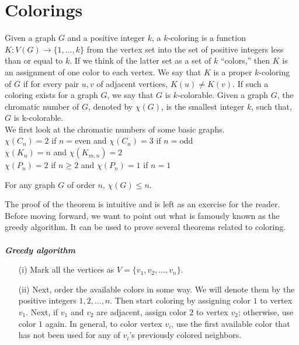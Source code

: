 \documentclass[../basic_graph_theory.tex]{subfiles}
\begin{document}
\chapter{Colorings}
\setcounter{chapter}{7} %
\setcounter{section}{7}
\setcounter{equation}{7}
\setcounter{figure}{7}

Given a graph $G$ and a positive integer $k$, a $k$-coloring is a function $K : V (G) \to \{1,...,k\}$ from the vertex set into the set of positive integers less than or equal to $k$. If we think of the latter set as a set of $k$ “colors,” then $K$ is an assignment of one color to each vertex. We say that $K$ is a proper $k$-coloring of $G$ if for every pair $u,v$ of adjacent vertices, $K(u) \neq K(v)$. If such a coloring exists for a graph $G$, we say that $G$ is $k$-colorable. Given a graph $G$, the chromatic number of $G$, denoted by $\chi(G)$, is the smallest integer $k$, such that, $G$ is k-colorable.\\
We first look at the chromatic numbers of some basic graphs.\\
$\chi(C_n)=2$ if $n=$even and $\chi(C_n)=3$ if $n=$odd\\
$\chi(K_n)=n$ and $\chi(K_{m,n})=2$\\
$\chi(P_n)=2$ if $n \ge 2$ and $\chi(P_n)=1$ if $n=1$\\

\begin{thm}
    For any graph $G$ of order $n$, $\chi(G) \le n$. 
\end{thm}
The proof of the theorem is intuitive and is left as an exercise for the reader.\\
Before moving forward, we want to point out what is famously known as the greedy algorithm. It can be used to prove several theorems related to coloring.\\
\\
\textbf{\em{Greedy algorithm}}
\begin{enumerate}
    \item[(i)] Mark all the vertices as $V=\{v_1, v_2, \dots, v_n\}$.
    \item[(ii)] Next, order the available colors in some way. We will denote them by the positive integers $1,2,\dots,n$. Then start coloring by assigning color $1$ to vertex $v_1$. Next, if $v_1$ and $v_2$ are adjacent, assign color $2$ to vertex $v_2$; otherwise, use color $1$ again. In general, to color vertex $v_i$, use the first available color that has not been used for any of $v_i$'s previously colored neighbors.
\end{enumerate}
\end{document}
